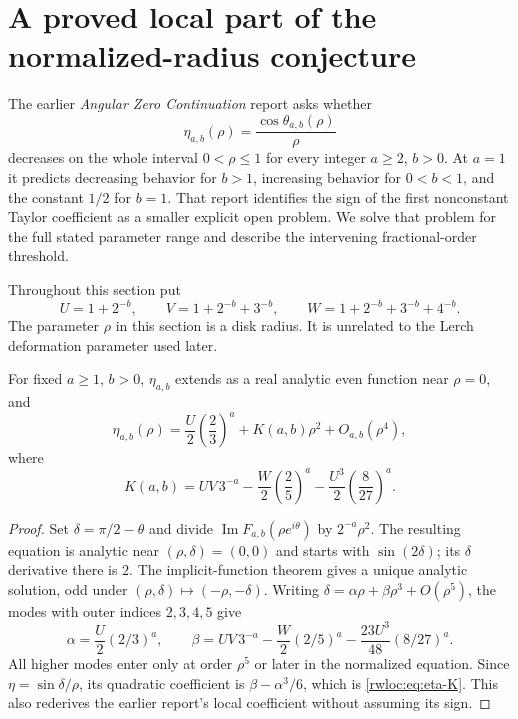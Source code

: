 \section{A proved local part of the normalized-radius conjecture}
\label{rwloc:sec:local-radius}

The earlier \emph{Angular Zero Continuation} report \cite{rw:AngularReport}
asks whether
\[
 \eta_{a,b}(\rho)=\frac{\cos\theta_{a,b}(\rho)}{\rho}
\]
decreases on the whole interval $0<\rho\le1$ for every integer
$a\ge2$, $b>0$. At $a=1$ it predicts decreasing behavior for $b>1$,
increasing behavior for $0<b<1$, and the constant $1/2$ for $b=1$.
That report identifies the sign of the first nonconstant Taylor
coefficient as a smaller explicit open problem. We solve that problem
for the full stated parameter range and describe the intervening
fractional-order threshold.

Throughout this section put
\[
 U=1+2^{-b},\qquad V=1+2^{-b}+3^{-b},\qquad
 W=1+2^{-b}+3^{-b}+4^{-b}.
\]
The parameter $\rho$ in this section is a disk radius. It is unrelated
to the Lerch deformation parameter used later.

\begin{lemma}\label{rwloc:lem:radius-coefficient}
For fixed $a\ge1$, $b>0$, $\eta_{a,b}$ extends as a real analytic
even function near $\rho=0$, and
\begin{equation}\label{rwloc:eq:eta-expansion}
 \eta_{a,b}(\rho)=\frac U2\left(\frac23\right)^a
                    +K(a,b)\rho^2+O_{a,b}(\rho^4),
\end{equation}
where
\begin{equation}\label{rwloc:eq:eta-K}
 K(a,b)=UV\,3^{-a}-\frac W2\left(\frac25\right)^a
                  -\frac{U^3}{2}\left(\frac8{27}\right)^a.
\end{equation}
\end{lemma}

\begin{proof}
Set $\delta=\pi/2-\theta$ and divide
$\operatorname{Im}F_{a,b}(\rho e^{i\theta})$ by $2^{-a}\rho^2$.
The resulting equation is analytic near $(\rho,\delta)=(0,0)$
and starts with $\sin(2\delta)$; its $\delta$ derivative there is
$2$. The implicit-function theorem gives a unique analytic solution,
odd under $(\rho,\delta)\mapsto(-\rho,-\delta)$.
Writing $\delta=\alpha\rho+\beta\rho^3+O(\rho^5)$, the modes
with outer indices $2,3,4,5$ give
\[
 \alpha=\frac U2(2/3)^a,\qquad
 \beta=UV\,3^{-a}-\frac W2(2/5)^a
                   -\frac{23U^3}{48}(8/27)^a.
\]
All higher modes enter only at order $\rho^5$ or later in the
normalized equation. Since $\eta=\sin\delta/\rho$, its quadratic
coefficient is $\beta-\alpha^3/6$, which is \eqref{rwloc:eq:eta-K}.
This also rederives the earlier report's local coefficient without
assuming its sign.
\end{proof}

